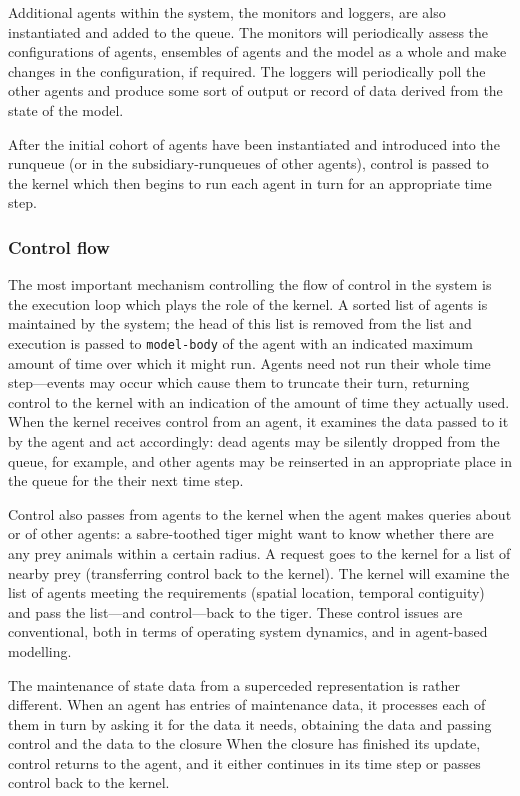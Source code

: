 Additional agents within the system, the monitors and loggers, are
also instantiated and added to the queue. The monitors will
periodically assess the configurations of agents, ensembles of agents
and the model as a whole and make changes in the configuration, if
required.  The loggers will periodically poll the other agents and
produce some sort of output or record of data derived from the state
of the model.

After the initial cohort of agents have been instantiated and
introduced into the runqueue (or in the subsidiary-runqueues of other
agents), control is passed to the kernel which then begins to run each
agent in turn for an appropriate time step.

\subsubsection{Control flow}

The most important mechanism controlling the flow of control in the
system is the execution loop which plays the role of the kernel. A
sorted list of agents is maintained by the system; the head of this
list is removed from the list and execution is passed to
\texttt{model-body} of the agent with an indicated maximum amount of
time over which it might run.  Agents need not run their whole time
step---events may occur which cause them to truncate their turn,
returning control to the kernel with an indication of the amount of
time they actually used.  When the kernel receives control from an
agent, it examines the data passed to it by the agent and act
accordingly: dead agents may be silently dropped from the queue, for
example, and other agents may be reinserted in an appropriate place in
the queue for the their next time step.

Control also passes from agents to the kernel when the agent makes
queries about or of other agents: a sabre-toothed tiger might want to
know whether there are any prey animals within a certain radius.  A
request goes to the kernel for a list of nearby prey (transferring
control back to the kernel).  The kernel will examine the list of
agents meeting the requirements (spatial location, temporal
contiguity) and pass the list---and control---back to the tiger.
These control issues are conventional, both in terms of operating
system dynamics, and in agent-based modelling.

The maintenance of state data from a superceded representation is
rather different. When an agent has entries of maintenance data, it
processes each of them in turn by asking it for the data it needs,
obtaining the data and passing control and the data to the closure
When the closure has finished its update, control returns to the
agent, and it either continues in its time step or passes control back
to the kernel.

